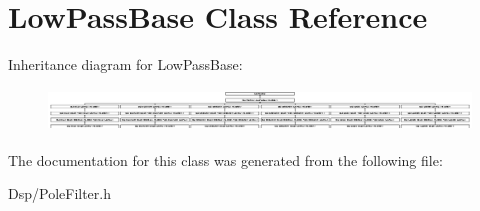 \hypertarget{classLowPassBase}{\section{Low\-Pass\-Base Class Reference}
\label{classLowPassBase}
}
Inheritance diagram for Low\-Pass\-Base\-:\begin{figure}[H]
\begin{center}
\leavevmode
\includegraphics[height=1.147541cm]{classLowPassBase}
\end{center}
\end{figure}


The documentation for this class was generated from the following file\-:\begin{DoxyCompactItemize}
\item 
Dsp/Pole\-Filter.\-h\end{DoxyCompactItemize}
